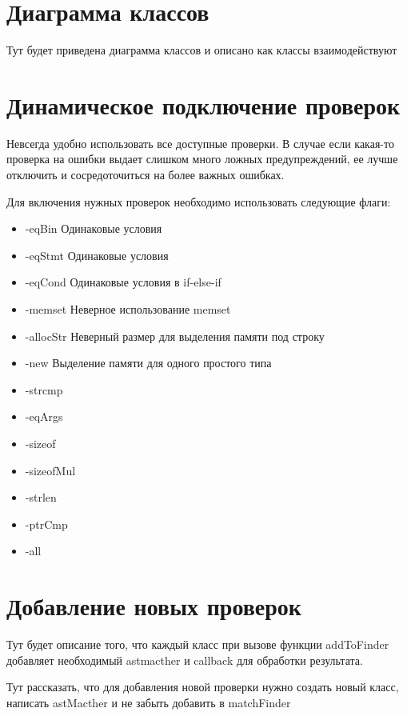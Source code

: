 \section{Диаграмма классов}
Тут будет приведена диаграмма классов и описано как классы взаимодействуют

\section{Динамическое подключение проверок}
Невсегда удобно использовать все доступные проверки. В случае если какая-то проверка на ошибки
выдает слишком много ложных предупреждений, ее лучше отключить и сосредоточиться на более важных
ошибках. 

Для включения нужных проверок необходимо использовать следующие флаги:
\begin{itemize}
	\item -eqBin	Одинаковые условия
	\item -eqStmt	Одинаковые условия
	\item -eqCond	Одинаковые условия в if-else-if
	\item -memset	Неверное использование memset
	\item -allocStr	Неверный размер для выделения памяти под строку
	\item -new		Выделение памяти для одного простого типа
	\item -strcmp
	\item -eqArgs
	\item -sizeof
	\item -sizeofMul
	\item -strlen
	\item -ptrCmp
	\item -all
\end{itemize}

\section{Добавление новых проверок}
Тут будет описание того, что каждый класс при вызове функции addToFinder
добавляет необходимый astmacther и callback для обработки результата.

Тут рассказать, что для добавления новой проверки нужно создать новый класс, написать astMacther
и не забыть добавить в matchFinder